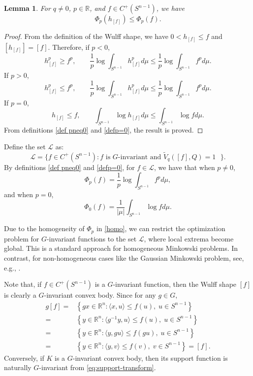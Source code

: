 \documentclass[12pt, reqno]{amsart}
\newtheorem{lemma}[theorem]{Lemma}
\theoremstyle{definition}
\theoremstyle{remark}
\numberwithin{equation}{section}
\newcommand{\R}{\mathbb{R}}
\newcommand{\Sn}{S^{n-1}}
\newcommand{\la}{\langle}
\newcommand{\ra}{\rangle}
\begin{document}
	
	\begin{lemma}\label{inf sup}
		For $q\neq0$, $p\in\R$, and $f\in C^{+}(\Sn)$, we have
		\begin{equation}
				\Phi_{p}(h_{[f]})\le \Phi_{p}(f).
		\end{equation}
	\end{lemma}
	
	
	\begin{proof}
		From the definition of the Wulff shape, we have $0<h_{[f]}\le f$ and $[h_{[f]}]=[f]$. Therefore, if $p<0$,
		$$h_{[f]}^{p}\ge f^{p}, \quad \quad \frac{1}{p} \log \int_{S^{n-1}} h_{[f]}^{p}  d\mu \le \frac{1}{p} \log \int_{S^{n-1}} f^{p}  d\mu.$$
		If $p>0$,
		$$h_{[f]}^{p}\le f^{p}, \quad \quad \frac{1}{p} \log \int_{S^{n-1}} h_{[f]}^{p}  d\mu \le \frac{1}{p} \log \int_{S^{n-1}} f^{p}  d\mu.$$
		If $p=0$,
		$$h_{[f]}\le f,\quad \quad \int _{S^{n-1}}\log h_{[f]} d\mu \le \int _{S^{n-1}}\log f d\mu.$$
		From  definitions \eqref{def pneq0} and \eqref{defp=0}, the result is proved.
	\end{proof}
	
	Define the set $\mathcal{L}$ as:
	\begin{equation}\label{L}
		\mathcal{L}=\{f\in C^{+}(\Sn): \text{$f$ is $G$-invariant and $\widetilde{V}_{q}([f], Q)=1$ }\}.
	\end{equation}
	By  definitions \eqref{def pneq0} and \eqref{defp=0}, for $f\in\mathcal{L}$, we have that when $p\neq 0$,
		\begin{equation}\label{Lpneq0}
		\Phi_{p}(f) = \frac{1}{p} \log \int_{S^{n-1}} f^{p}  d\mu,
	\end{equation}
	and when $p=0$, 
	\begin{equation}\label{Lq=0}
		\Phi_{0}(f) = \frac{1}{|\mu|} \int _{S^{n-1}}\log f  d\mu.
	\end{equation}
	
	
	Due to the homogeneity of $\Phi_{p}$ in \eqref{homo}, we can restrict the optimization problem for $G$-invariant functions to the set $\mathcal{L}$, where local extrema become global. This is a standard approach for homogeneous Minkowski problems. In contrast, for non-homogeneous cases like the Gaussian Minkowski problem, see, e.g., \cite{Huang2021,Liu2022,shan2025}.
	
	
	Note that, if $f\in C^{+}(\Sn)$ is a $G$-invariant function, then the Wulff shape $[f]$ is clearly a $G$-invariant convex body. Since for any $g\in G$,
	\begin{align*}
		g[f]=&\left\{gx\in \mathbb{R}^{n}: \la x, u \ra \le f(u),\;  u\in S^{n-1}\right\}\\
		=&\left\{y\in \mathbb{R}^{n}: \la g^{-1}y, u \ra \le f(u),\;  u\in S^{n-1}\right\}\\
		=&\left\{y\in \mathbb{R}^{n}: \la y, gu \ra \le f(gu),\;  u\in S^{n-1}\right\}\\
				=&\left\{y\in \mathbb{R}^{n}: \la y, v \ra \le f(v),\;  v\in S^{n-1}\right\}=[f].
	\end{align*}
	Conversely, if $K$ is a $G$-invariant convex body, then its support function is naturally $G$-invariant from \eqref{eq:support-transform}.
	
\end{document}
